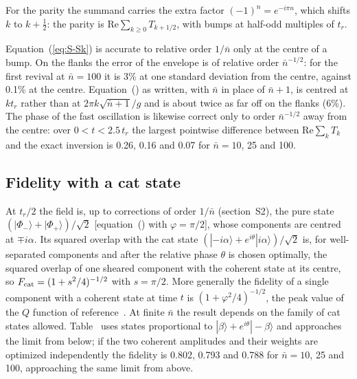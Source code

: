 \documentclass{iopjournal}
\newcommand{\nbar}{\bar{n}}
\newcommand{\ket}[1]{|#1\rangle}
\begin{document}
For the parity the summand carries the extra factor $(-1)^n = e^{-i\pi n}$, which shifts $k$ to $k+\tfrac12$: the parity is $\mathrm{Re}\sum_{k\geq0}T_{k+1/2}$, with bumps at half-odd multiples of $t_r$.

Equation~(\ref{eq:S-Sk}) is accurate to relative order $1/\nbar$ only at the centre of a bump. On the flanks the error of the envelope is of relative order $\nbar^{-1/2}$: for the first revival at $\nbar = 100$ it is 3\% at one standard deviation from the centre, against 0.1\% at the centre. Equation~() as written, with $\nbar$ in place of $\nbar+1$, is centred at $kt_r$ rather than at $2\pi k\sqrt{\nbar+1}/g$ and is about twice as far off on the flanks (6\%). The phase of the fast oscillation is likewise correct only to order $\nbar^{-1/2}$ away from the centre: over $0<t<2.5\,t_r$ the largest pointwise difference between $\mathrm{Re}\sum_k T_k$ and the exact inversion is 0.26, 0.16 and 0.07 for $\nbar = 10$, 25 and 100.

\subsection{Fidelity with a cat state}
At $t_r/2$ the field is, up to corrections of order $1/\nbar$ (section~S2), the pure state $(\ket{\Phi_-}+\ket{\Phi_+})/\sqrt{2}$ [equation~() with $\varphi = \pi/2$], whose components are centred at $\mp i\alpha$. Its squared overlap with the cat state $(\ket{{-}i\alpha}+e^{i\theta}\ket{i\alpha})/\sqrt2$ is, for well-separated components and after the relative phase $\theta$ is chosen optimally, the squared overlap of one sheared component with the coherent state at its centre, so $F_{\rm cat} = (1+s^2/4)^{-1/2}$ with $s = \pi/2$. More generally the fidelity of a single component with a coherent state at time $t$ is $(1+\varphi^2/4)^{-1/2}$, the peak value of the $Q$ function of reference~\cite{S-gea1991}. At finite $\nbar$ the result depends on the family of cat states allowed. Table~ uses states proportional to $\ket{\beta}+e^{i\theta}\ket{{-}\beta}$ and approaches the limit from below; if the two coherent amplitudes and their weights are optimized independently the fidelity is 0.802, 0.793 and 0.788 for $\nbar = 10$, 25 and 100, approaching the same limit from above.
\end{document}
